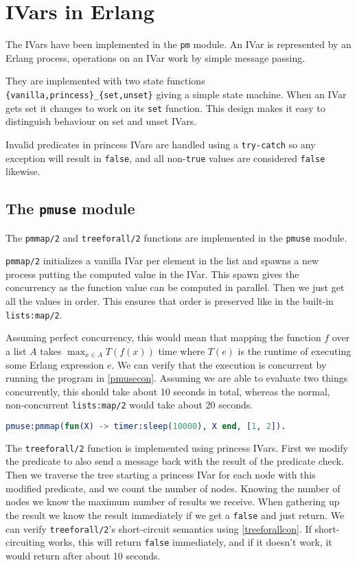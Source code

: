 
\section{IVars in Erlang}

The IVars have been implemented in the \verb|pm| module. An IVar is represented
by an Erlang process, operations on an IVar work by simple message passing.

They are implemented with two state functions
\verb|{vanilla,princess}_{set,unset}| giving a simple state machine. When an
IVar gets set it changes to work on its \verb|set| function. This design makes
it easy to distinguish behaviour on set and unset IVars.

Invalid predicates in princess IVars are handled using a \verb|try-catch| so
any exception will result in \verb|false|, and all non-\verb|true| values are
considered \verb|false| likewise.

\subsection{The \texttt{pmuse} module}
\label{module_pmuse}

The \verb|pmmap/2| and \verb|treeforall/2| functions are implemented in the
\verb|pmuse| module.

\verb|pmmap/2| initializes a vanilla IVar per element in the list and spawns a
new process putting the computed value in the IVar. This spawn gives the
concurrency as the function value can be computed in parallel. Then we just get
all the values in order. This ensures that order is preserved like in the
built-in \verb|lists:map/2|.

Assuming perfect concurrency, this would mean that mapping the function $f$
over a list $A$ takes $\max_{x \in A} T(f(x))$ time where $T(e)$ is the runtime
of executing some Erlang expression $e$. We can verify that the execution is
concurrent by running the program in \autoref{pmusecon}. Assuming we are able
to evaluate two things concurrently, this should take about 10 seconds in
total, whereas the normal, non-concurrent \verb|lists:map/2| would take about
20 seconds.

\begin{lstlisting}[language=Erlang,caption={Testing concurrency of \texttt{pmmap}},label=pmusecon]
pmuse:pmmap(fun(X) -> timer:sleep(10000), X end, [1, 2]).
\end{lstlisting}

The \verb|treeforall/2| function is implemented using princess IVars. First we
modify the predicate to also send a message back with the result of the
predicate check. Then we traverse the tree starting a princess IVar for each
node with this modified predicate, and we count the number of nodes. Knowing
the number of nodes we know the maximum number of results we receive. When
gathering up the result we know the result immediately if we get a \verb|false|
and just return. We can verify \verb|treeforall/2|'s short-circuit semantics
using \autoref{treeforallcon}. If short-circuiting works, this will return
\verb|false| immediately, and if it doesn't work, it would return after about
10 seconds.

